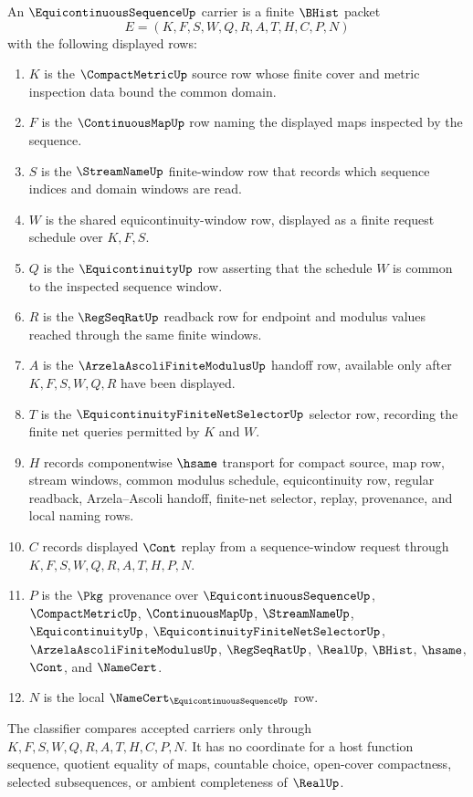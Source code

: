 \begin{definition}
\label{def:equicontinuous-sequence-carrier}
An $\EquicontinuousSequenceUp$ carrier is a finite $\BHist$ packet
$$
E=(K,F,S,W,Q,R,A,T,H,C,P,N)
$$
with the following displayed rows:
\begin{enumerate}
\item $K$ is the $\CompactMetricUp$ source row whose finite cover and metric inspection data bound the common domain.
\item $F$ is the $\ContinuousMapUp$ row naming the displayed maps inspected by the sequence.
\item $S$ is the $\StreamNameUp$ finite-window row that records which sequence indices and domain windows are read.
\item $W$ is the shared equicontinuity-window row, displayed as a finite request schedule over $K,F,S$.
\item $Q$ is the $\EquicontinuityUp$ row asserting that the schedule $W$ is common to the inspected sequence window.
\item $R$ is the $\RegSeqRatUp$ readback row for endpoint and modulus values reached through the same finite windows.
\item $A$ is the $\ArzelaAscoliFiniteModulusUp$ handoff row, available only after $K,F,S,W,Q,R$ have been displayed.
\item $T$ is the $\EquicontinuityFiniteNetSelectorUp$ selector row, recording the finite net queries permitted by $K$ and $W$.
\item $H$ records componentwise $\hsame$ transport for compact source, map row, stream windows, common modulus schedule, equicontinuity row, regular readback, Arzela--Ascoli handoff, finite-net selector, replay, provenance, and local naming rows.
\item $C$ records displayed $\Cont$ replay from a sequence-window request through $K,F,S,W,Q,R,A,T,H,P,N$.
\item $P$ is the $\Pkg$ provenance over $\EquicontinuousSequenceUp$, $\CompactMetricUp$, $\ContinuousMapUp$, $\StreamNameUp$, $\EquicontinuityUp$, $\EquicontinuityFiniteNetSelectorUp$, $\ArzelaAscoliFiniteModulusUp$, $\RegSeqRatUp$, $\RealUp$, $\BHist$, $\hsame$, $\Cont$, and $\NameCert$.
\item $N$ is the local $\NameCert_{\EquicontinuousSequenceUp}$ row.
\end{enumerate}
The classifier compares accepted carriers only through $K,F,S,W,Q,R,A,T,H,C,P,N$. It has no coordinate for a host function sequence, quotient equality of maps, countable choice, open-cover compactness, selected subsequences, or ambient completeness of $\RealUp$.
\end{definition}

